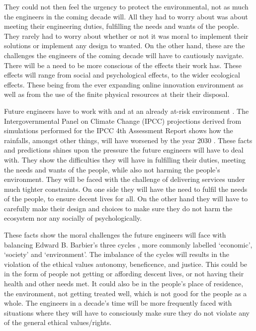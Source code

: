 \documentclass[12pt]{witseiepaper}
\begin{document}
    They could not then feel the urgency to protect the environmental, not as much the engineers in the coming decade will. All they had to worry about was about meeting their engineering duties, fulfilling the needs and wants of the people. They rarely had to worry about whether or not it was moral to implement their solutions or implement any design to wanted. On the other hand, these are the challenges the engineers of the coming decade will have to cautiously navigate. There will be a need to be more conscious of the effects their work has. These effects will range from social and psychological effects, to the wider ecological effects. These being from the ever expanding online innovation environment as well as from the use of the finite physical resources at their their disposal. 
    
    Future engineers have to work with and at an already at-risk environment \citep{macnaghten2006risk}. The Intergovernmental Panel on Climate Change (IPCC) projections derived from simulations performed for the IPCC 4th Assessment Report shows how the rainfalls, amongst other things, will have worsened by the year 2030 \citep{suppiah2007australian}. These facts and predictions shines upon the pressure the future engineers will have to deal with. They show the difficulties they will have in fulfilling their duties, meeting the needs and wants of the people, while also not harming the people's environment. They will be faced with the challenge of delivering services under much tighter constraints.
    On one side they will have the need to fulfil the needs of the people, to ensure decent lives for all. On the other hand they will have to carefully make their design and choices to make sure they do not harm the ecosystem nor any socially of psychologically. 
    
    These facts show the moral challenges the future engineers will face with balancing Edward B. Barbier’s three cycles \citep{barbier1987concept}, more commonly labelled ‘economic’, ‘society’ and ‘environment’. The imbalance of the cycles will results in the violation of the ethical values autonomy, beneficence, and justice. This could be in the form of people not getting or affording descent lives, or not having their health and other needs met. It could also be in the people’s place of residence, the environment, not getting treated well, which is not good for the people as a whole. The engineers in a decade’s time will be more frequently faced with situations where they will have to consciously make sure they do not violate any of the general ethical values/rights. 
\end{document}
